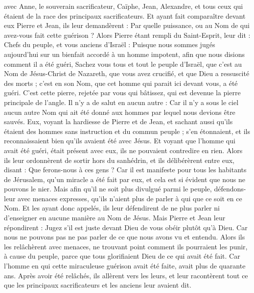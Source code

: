 \begin{multicols}{2}
avec Anne, le souverain sacrificateur, Caïphe, Jean, Alexandre, et tous ceux qui étaient de la race des principaux sacrificateurs.
Et ayant fait comparaître devant eux Pierre et Jean, ils leur demandèrent : Par quelle puissance, ou au Nom de qui avez-vous fait cette guérison ?
Alors Pierre étant rempli du Saint-Esprit, leur dit : Chefs du peuple, et vous anciens d'Israël :
Puisque nous sommes jugés aujourd'hui sur un bienfait accordé à un homme impotent, afin que nous disions comment il a été guéri,
Sachez vous tous et tout le peuple d'Israël, que c'est au Nom de Jésus-Christ de Nazareth, que vous avez crucifié, et que Dieu a ressuscité des morts ; c'est en son Nom, que cet homme qui parait ici devant vous, a été guéri.
C'est cette pierre, rejetée par vous qui bâtissez, qui est devenue la pierre principale de l'angle.
Il n'y a de salut en aucun autre : Car il n'y a sous le ciel aucun autre Nom qui ait été donné aux hommes par lequel nous devions être sauvés.
Eux, voyant la hardiesse de Pierre et de Jean, et sachant aussi qu'ils étaient des hommes sans instruction et du commun peuple ; s'en étonnaient, et ils reconnaissaient bien qu'ils avaient été avec Jésus.
Et voyant que l'homme qui avait été guéri, était présent avec eux, ils ne pouvaient contredire en rien.
Alors ils leur ordonnèrent de sortir hors du sanhédrin, et ils délibérèrent entre eux, disant : Que ferons-nous à ces gens ?
Car il est manifeste pour tous les habitants de Jérusalem, qu'un miracle a été fait par eux, et cela est si évident que nous ne pouvons le nier.
Mais afin qu'il ne soit plus divulgué parmi le peuple, défendons-leur avec menaces expresses, qu'ils n'aient plus de parler à qui que ce soit en ce Nom.
Et les ayant donc appelés, ils leur défendirent de ne plus parler ni d'enseigner en aucune manière au Nom de Jésus.
Mais Pierre et Jean leur répondirent : Jugez s'il est juste devant Dieu de vous obéir plutôt qu'à Dieu.
Car nous ne pouvons pas ne pas parler de ce que nous avons vu et entendu.
Alors ils les relâchèrent avec menaces, ne trouvant point comment ils pourraient les punir, à cause du peuple, parce que tous glorifiaient Dieu de ce qui avait été fait.
Car l'homme en qui cette miraculeuse guérison avait été faite, avait plus de quarante ans.
Après avoir été relâchés, ils allèrent vers les leurs, et leur racontèrent tout ce que les principaux sacrificateurs et les anciens leur avaient dit.

\end{multicols}

